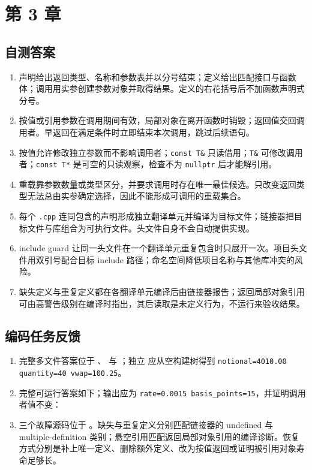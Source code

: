 \section{第 3 章}
\subsection*{自测答案}
\begin{enumerate}
  \item 声明给出返回类型、名称和参数表并以分号结束；定义给出匹配接口与函数体；调用用实参创建参数对象并取得结果。定义的右花括号后不加函数声明式分号。
  \item 按值或引用参数在调用期间有效，局部对象在离开函数时销毁；返回值交回调用者。早返回在满足条件时立即结束本次调用，跳过后续语句。
  \item 按值允许修改独立参数而不影响调用者；\texttt{const T\&} 只读借用；\texttt{T\&} 可修改调用者；\texttt{const T*} 是可空的只读观察，检查不为 \texttt{nullptr} 后才能解引用。
  \item 重载靠参数数量或类型区分，并要求调用时存在唯一最佳候选。只改变返回类型无法总由实参确定选择，因此不能形成可调用的重载集合。
  \item 每个 \texttt{.cpp} 连同包含的声明形成独立翻译单元并编译为目标文件；链接器把目标文件与库组合为可执行文件。头文件自身不会自动提供实现。
  \item include guard 让同一头文件在一个翻译单元重复包含时只展开一次。项目头文件用双引号配合目标 include 路径；命名空间降低项目名称与其他库冲突的风险。
  \item 缺失定义与重复定义都在各翻译单元编译后由链接器报告；返回局部对象引用可由高警告级别在编译时指出，其后读取是未定义行为，不运行来验收结果。
\end{enumerate}

\subsection*{编码任务反馈}
\begin{enumerate}
  \item 完整多文件答案位于 、 与 ；独立  应从空构建树得到 \texttt{notional=4010.00 quantity=40 vwap=100.25}。
  \item 完整可运行答案如下；输出应为 \texttt{rate=0.0015 basis\_points=15}，并证明调用者值不变：

  \item 三个故障源码位于 。缺失与重复定义分别匹配链接器的 undefined 与 multiple-definition 类别；悬空引用匹配返回局部对象引用的编译诊断。恢复方式分别是补上唯一定义、删除额外定义、改为按值返回或证明被引用对象寿命足够长。
\end{enumerate}

